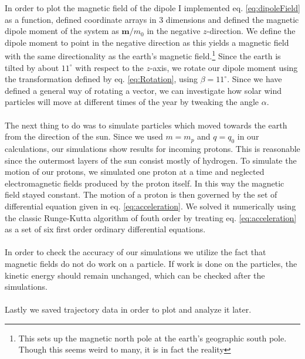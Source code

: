 \noindent In order to plot the magnetic field of the dipole I implemented eq. \ref{eq:dipoleField} as a function, defined coordinate arrays in 3 dimensions and defined the magnetic dipole moment of the system as $\boldsymbol{m}/m_0$ in the negative $z$-direction. We define the dipole moment to point in the negative direction as this yields a magnetic field with the same directionality as the earth's magnetic field.\footnote{This sets up the magnetic north pole at the earth's geographic south pole. Though this seems weird to many, it is in fact the reality} Since the earth is tilted by about $11^{\circ}$ with respect to the $z$-axis, we rotate our dipole moment using the transformation defined by eq. \ref{eq:Rotation}, using $\beta=11^{\circ}$. Since we have defined a general way of rotating a vector, we can investigate how solar wind particles will move at different times of the year by tweaking the angle $\alpha$.\\
\\
The next thing to do was to simulate particles which moved towards the earth from the direction of the sun. Since we used $m=m_p$ and $q=q_0$ in our calculations, our simulations show results for incoming protons. This is reasonable since the outermost layers of the sun consist mostly of hydrogen. To simulate the motion of our protons, we simulated one proton at a time and neglected electromagnetic fields produced by the proton itself. In this way the magnetic field stayed constant. The motion of a proton is then governed by the set of differential equation given in eq. \ref{eq:acceleration}. We solved it numerically using the classic Runge-Kutta algorithm of fouth order by treating eq. \ref{eq:acceleration} as a set of six first order ordinary differential equations.\\
\\
In order to check the accuracy of our simulations we utilize the fact that magnetic fields do not do work on a particle. If work is done on the particles, the kinetic energy should remain unchanged, which can be checked after the simulations.\\
\\
Lastly we saved trajectory data in order to plot and analyze it later.\\